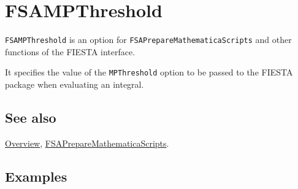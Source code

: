 \documentclass[../FeynHelpersManual.tex]{subfiles}
\begin{document}
\hypertarget{fsampthreshold}{
\section{FSAMPThreshold}\label{fsampthreshold}}

\texttt{FSAMPThreshold} is an option for
\texttt{FSAPrepareMathematicaScripts} and other functions of the FIESTA
interface.

It specifies the value of the \texttt{MPThreshold} option to be passed
to the FIESTA package when evaluating an integral.

\subsection{See also}

\hyperlink{toc}{Overview},
\hyperlink{fsapreparemathematicascripts}{FSAPrepareMathematicaScripts}.

\subsection{Examples}
\end{document}
